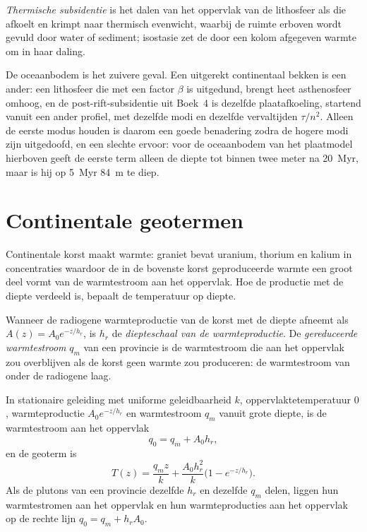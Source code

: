 \begin{definition}\label{def:b3:lithosphere-thermal-models:thermal-subsidence}
\emph{Thermische subsidentie} is het dalen van het
oppervlak van de lithosfeer als die afkoelt en krimpt naar thermisch evenwicht,
waarbij de ruimte erboven wordt gevuld door water of sediment; isostasie
zet de door een kolom afgegeven warmte om in haar daling.
\end{definition}

De oceaanbodem is het zuivere geval. Een uitgerekt continentaal bekken is een ander: een
lithosfeer die met een factor $\beta$ is uitgedund, brengt heet asthenosfeer omhoog, en de
post-rift-subsidentie uit Boek~4 is dezelfde plaatafkoeling, startend vanuit een ander
profiel, met dezelfde modi en dezelfde vervaltijden $\tau/n^2$.
Alleen de eerste modus houden is daarom een goede benadering zodra de hogere modi zijn uitgedoofd,
en een slechte ervoor: voor de oceaanbodem van het plaatmodel hierboven geeft de eerste term alleen
de diepte tot binnen twee meter na
\qty{20}{Myr}, maar is hij op \qty{5}{Myr} \qty{84}{m} te diep.

\section{Continentale geotermen}

Continentale korst maakt warmte: graniet bevat uranium, thorium en kalium in
concentraties waardoor de in de bovenste korst geproduceerde warmte een groot deel vormt van
de warmtestroom aan het oppervlak. Hoe de productie met de diepte verdeeld is,
bepaalt de temperatuur op diepte.

\begin{definition}\label{def:b3:lithosphere-thermal-models:reduced}
Wanneer de radiogene warmteproductie van de korst met de diepte afneemt als
$A(z) = A_0e^{-z/h_r}$, is $h_r$ de \emph{diepteschaal van de
warmteproductie}. De \emph{gereduceerde
warmtestroom} $q_m$ van een provincie is de warmtestroom die
aan het oppervlak zou overblijven als de korst geen warmte zou produceren: de warmtestroom
van onder de radiogene laag.
\end{definition}

\begin{proposition}\label{prop:b3:lithosphere-thermal-models:exponential}
In stationaire geleiding met uniforme geleidbaarheid $k$, oppervlaktetemperatuur $0$,
warmteproductie $A_0e^{-z/h_r}$ en warmtestroom $q_m$ vanuit grote diepte, is de
warmtestroom aan het oppervlak
\[
  q_0 = q_m + A_0h_r,
\]
en de geoterm is
\[
  T(z) = \frac{q_mz}{k} + \frac{A_0h_r^2}{k}\bigl(1 - e^{-z/h_r}\bigr).
\]
Als de plutons van een provincie dezelfde $h_r$ en dezelfde $q_m$ delen, liggen hun
warmtestromen aan het oppervlak en hun warmteproducties aan het oppervlak op de rechte lijn
$q_0 = q_m + h_rA_0$.
\end{proposition}

